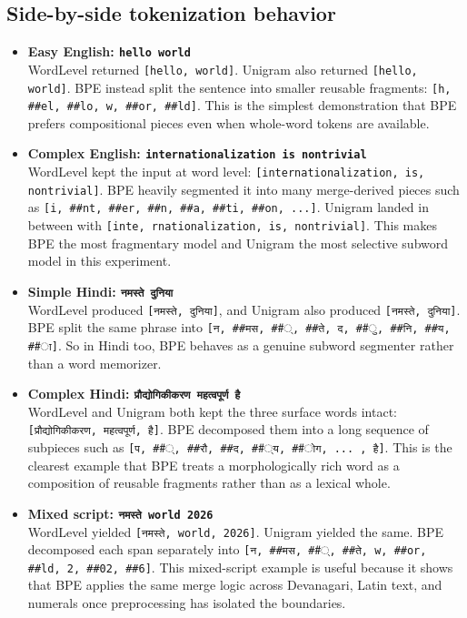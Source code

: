 \documentclass{article}
\begin{document}
\subsection{Side-by-side tokenization behavior}

\begin{itemize}
    \item \textbf{Easy English: \texttt{hello world}} \\
    WordLevel returned \texttt{[hello, world]}. Unigram also returned \texttt{[hello, world]}. BPE instead split the sentence into smaller reusable fragments: \texttt{[h, \#\#el, \#\#lo, w, \#\#or, \#\#ld]}. This is the simplest demonstration that BPE prefers compositional pieces even when whole-word tokens are available.

    \item \textbf{Complex English: \texttt{internationalization is nontrivial}} \\
    WordLevel kept the input at word level: \texttt{[internationalization, is, nontrivial]}. BPE heavily segmented it into many merge-derived pieces such as \texttt{[i, \#\#nt, \#\#er, \#\#n, \#\#a, \#\#ti, \#\#on, ...]}. Unigram landed in between with \texttt{[inte, rnationalization, is, nontrivial]}. This makes BPE the most fragmentary model and Unigram the most selective subword model in this experiment.

    \item \textbf{Simple Hindi: \texttt{नमस्ते दुनिया}} \\
    WordLevel produced \texttt{[नमस्ते, दुनिया]}, and Unigram also produced \texttt{[नमस्ते, दुनिया]}. BPE split the same phrase into \texttt{[न, \#\#मस, \#\#्, \#\#ते, द, \#\#ु, \#\#नि, \#\#य, \#\#ा]}. So in Hindi too, BPE behaves as a genuine subword segmenter rather than a word memorizer.

    \item \textbf{Complex Hindi: \texttt{प्रौद्योगिकीकरण महत्वपूर्ण है}} \\
    WordLevel and Unigram both kept the three surface words intact: \texttt{[प्रौद्योगिकीकरण, महत्वपूर्ण, है]}. BPE decomposed them into a long sequence of subpieces such as \texttt{[प, \#\#्, \#\#रौ, \#\#द, \#\#्य, \#\#ोग, ... , है]}. This is the clearest example that BPE treats a morphologically rich word as a composition of reusable fragments rather than as a lexical whole.

    \item \textbf{Mixed script: \texttt{नमस्ते world 2026}} \\
    WordLevel yielded \texttt{[नमस्ते, world, 2026]}. Unigram yielded the same. BPE decomposed each span separately into \texttt{[न, \#\#मस, \#\#्, \#\#ते, w, \#\#or, \#\#ld, 2, \#\#02, \#\#6]}. This mixed-script example is useful because it shows that BPE applies the same merge logic across Devanagari, Latin text, and numerals once preprocessing has isolated the boundaries.
\end{itemize}
\end{document}
